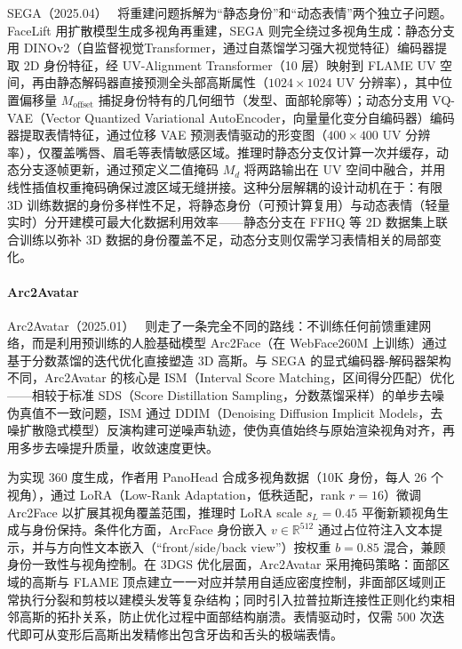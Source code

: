 SEGA（2025.04）~\cite{2504_14373} 将重建问题拆解为``静态身份''和``动态表情''两个独立子问题。FaceLift 用扩散模型生成多视角再重建，SEGA 则完全绕过多视角生成：静态分支用 DINOv2（自监督视觉Transformer，通过自蒸馏学习强大视觉特征）编码器提取 2D 身份特征，经 UV-Alignment Transformer（10 层）映射到 FLAME UV 空间，再由静态解码器直接预测全头部高斯属性（$1024 \times 1024$ UV 分辨率），其中位置偏移量 $M_{\text{offset}}$ 捕捉身份特有的几何细节（发型、面部轮廓等）；动态分支用 VQ-VAE（Vector Quantized Variational AutoEncoder，向量量化变分自编码器）编码器提取表情特征，通过位移 VAE 预测表情驱动的形变图（$400 \times 400$ UV 分辨率），仅覆盖嘴唇、眉毛等表情敏感区域。推理时静态分支仅计算一次并缓存，动态分支逐帧更新，通过预定义二值掩码 $M_d$ 将两路输出在 UV 空间中融合，并用线性插值权重掩码确保过渡区域无缝拼接。这种分层解耦的设计动机在于：有限 3D 训练数据的身份多样性不足，将静态身份（可预计算复用）与动态表情（轻量实时）分开建模可最大化数据利用效率——静态分支在 FFHQ 等 2D 数据集上联合训练以弥补 3D 数据的身份覆盖不足，动态分支则仅需学习表情相关的局部变化。

\paragraph{Arc2Avatar}

Arc2Avatar（2025.01）~\cite{2501_05379} 则走了一条完全不同的路线：不训练任何前馈重建网络，而是利用预训练的人脸基础模型 Arc2Face（在 WebFace260M 上训练）通过基于分数蒸馏的迭代优化直接塑造 3D 高斯。与 SEGA 的显式编码器-解码器架构不同，Arc2Avatar 的核心是 ISM（Interval Score Matching，区间得分匹配）优化——相较于标准 SDS（Score Distillation Sampling，分数蒸馏采样）的单步去噪伪真值不一致问题，ISM 通过 DDIM（Denoising Diffusion Implicit Models，去噪扩散隐式模型）反演构建可逆噪声轨迹，使伪真值始终与原始渲染视角对齐，再用多步去噪提升质量，收敛速度更快。

为实现 360 度生成，作者用 PanoHead 合成多视角数据（10K 身份，每人 26 个视角），通过 LoRA（Low-Rank Adaptation，低秩适配，rank $r=16$）微调 Arc2Face 以扩展其视角覆盖范围，推理时 LoRA scale $s_L = 0.45$ 平衡新颖视角生成与身份保持。条件化方面，ArcFace 身份嵌入 $v \in \mathbb{R}^{512}$ 通过占位符注入文本提示，并与方向性文本嵌入（``front/side/back view''）按权重 $b = 0.85$ 混合，兼顾身份一致性与视角控制。在 3DGS 优化层面，Arc2Avatar 采用掩码策略：面部区域的高斯与 FLAME 顶点建立一一对应并禁用自适应密度控制，非面部区域则正常执行分裂和剪枝以建模头发等复杂结构；同时引入拉普拉斯连接性正则化约束相邻高斯的拓扑关系，防止优化过程中面部结构崩溃。表情驱动时，仅需 500 次迭代即可从变形后高斯出发精修出包含牙齿和舌头的极端表情。

